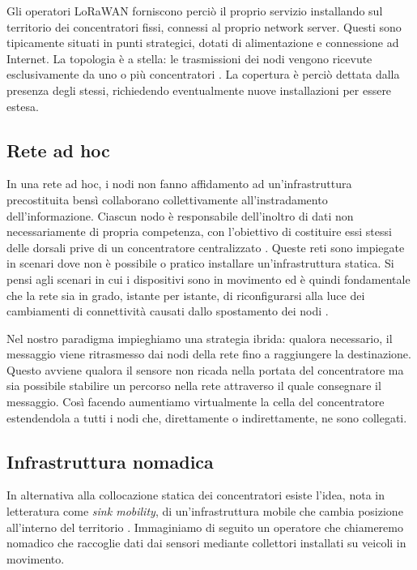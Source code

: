 \documentclass[a4paper,11pt]{article}
\theoremstyle{definition}
\begin{document}
Gli operatori LoRaWAN forniscono perciò il proprio servizio installando sul territorio dei concentratori fissi, connessi al proprio network server. Questi sono tipicamente situati in punti strategici, dotati di alimentazione e connessione ad Internet. La topologia è a stella: le trasmissioni dei nodi vengono ricevute esclusivamente da uno o più concentratori \cite{loraspec}. La copertura è perciò dettata dalla presenza degli stessi, richiedendo eventualmente nuove installazioni per essere estesa.

\subsection{Rete ad hoc}

In una rete ad hoc, i nodi non fanno affidamento ad un'infrastruttura precostituita bensì collaborano collettivamente all'instradamento dell'informazione. Ciascun nodo è responsabile dell'inoltro di dati non necessariamente di propria competenza, con l'obiettivo di costituire essi stessi delle dorsali prive di un concentratore centralizzato \cite{adhoc}. Queste reti sono impiegate in scenari dove non è possibile o pratico installare un'infrastruttura statica. Si pensi agli scenari in cui i dispositivi sono in movimento ed è quindi fondamentale che la rete sia in grado, istante per istante, di riconfigurarsi alla luce dei cambiamenti di connettività causati dallo spostamento dei nodi \cite{mobileadhoc}.

Nel nostro paradigma impieghiamo una strategia ibrida: qualora necessario, il messaggio viene ritrasmesso dai nodi della rete fino a raggiungere la destinazione. Questo avviene qualora il sensore non ricada nella portata del concentratore ma sia possibile stabilire un percorso nella rete attraverso il quale consegnare il messaggio. Così facendo aumentiamo virtualmente la cella del concentratore estendendola a tutti i nodi che, direttamente o indirettamente, ne sono collegati.

\subsection{Infrastruttura nomadica}

In alternativa alla collocazione statica dei concentratori esiste l'idea, nota in letteratura come \emph{sink mobility}, di un'infrastruttura mobile che cambia posizione all'interno del territorio \cite{sinkmob}. Immaginiamo di seguito un operatore che chiameremo nomadico che raccoglie dati dai sensori mediante collettori installati su veicoli in movimento.
\end{document}
